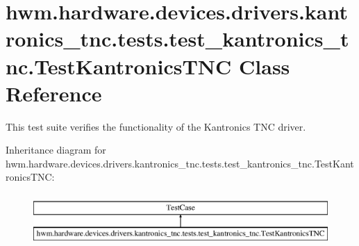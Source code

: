\hypertarget{classhwm_1_1hardware_1_1devices_1_1drivers_1_1kantronics__tnc_1_1tests_1_1test__kantronics__tnc_1_1_test_kantronics_t_n_c}{\section{hwm.\-hardware.\-devices.\-drivers.\-kantronics\-\_\-tnc.\-tests.\-test\-\_\-kantronics\-\_\-tnc.\-Test\-Kantronics\-T\-N\-C Class Reference}
\label{classhwm_1_1hardware_1_1devices_1_1drivers_1_1kantronics__tnc_1_1tests_1_1test__kantronics__tnc_1_1_test_kantronics_t_n_c}
}


This test suite verifies the functionality of the Kantronics T\-N\-C driver.  


Inheritance diagram for hwm.\-hardware.\-devices.\-drivers.\-kantronics\-\_\-tnc.\-tests.\-test\-\_\-kantronics\-\_\-tnc.\-Test\-Kantronics\-T\-N\-C\-:\begin{figure}[H]
\begin{center}
\leavevmode
\includegraphics[height=2.000000cm]{classhwm_1_1hardware_1_1devices_1_1drivers_1_1kantronics__tnc_1_1tests_1_1test__kantronics__tnc_1_1_test_kantronics_t_n_c}
\end{center}
\end{figure}
